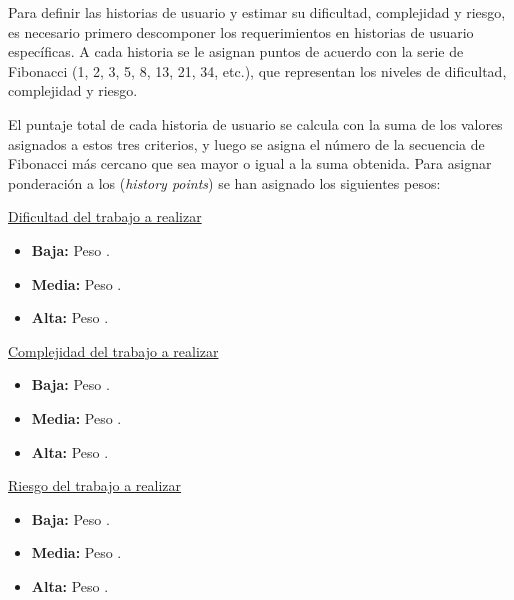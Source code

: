 Para definir las historias de usuario y estimar su dificultad, complejidad y riesgo, es necesario primero descomponer los requerimientos en historias de
usuario específicas. A cada historia se le asignan puntos de acuerdo con la serie de Fibonacci (1, 2, 3, 5, 8, 13, 21, 34, etc.), que representan los niveles
de dificultad, complejidad y riesgo.

El puntaje total de cada historia de usuario se calcula con la suma de los valores asignados a estos tres criterios, y luego se asigna el número de la
secuencia de Fibonacci más cercano que sea mayor o igual a la suma obtenida. Para asignar ponderación a los (\textit{history points}) se han asignado los
siguientes pesos:

\underline{Dificultad del trabajo a realizar}
\begin{itemize}
	\item \textbf{Baja:} Peso .
	\item \textbf{Media:} Peso .
	\item \textbf{Alta:} Peso .
\end{itemize}

\underline{Complejidad del trabajo a realizar}
\begin{itemize}
	\item \textbf{Baja:} Peso .
	\item \textbf{Media:} Peso .
	\item \textbf{Alta:} Peso .
\end{itemize}

\underline{Riesgo del trabajo a realizar}
\begin{itemize}
	\item \textbf{Baja:} Peso .
	\item \textbf{Media:} Peso .
	\item \textbf{Alta:} Peso .
\end{itemize}

